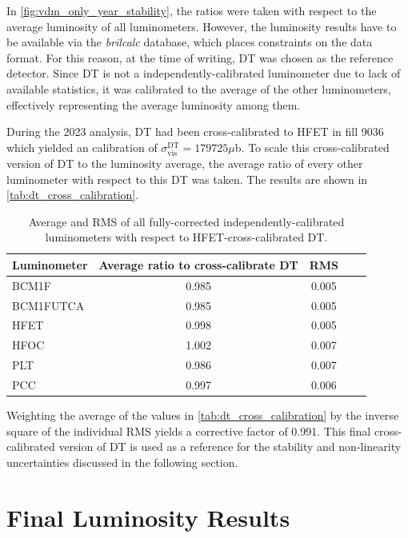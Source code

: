 In \autoref{fig:vdm_only_year_stability}, the ratios were taken with respect to the average luminosity of all luminometers. However, the luminosity results have to be available via the \textit{brilcalc} database, which places constraints on the data format. For this reason, at the time of writing, DT was chosen as the reference detector. Since DT is not a independently-calibrated luminometer due to lack of available statistics, it was calibrated to the average of the other luminometers, effectively representing the average luminosity among them.

During the 2023 analysis, DT had been cross-calibrated to HFET in fill 9036 which yielded an calibration of $\sigma^{\text{DT}}_{\mathrm{vis}} = 179725 \mu$b. To scale this cross-calibrated version of DT to the luminosity average, the average ratio of every other luminometer with respect to this DT was taken. The results are shown in \autoref{tab:dt_cross_calibration}.

\begin{table}[!htb]
	\caption{Average and RMS of all fully-corrected independently-calibrated luminometers with respect to HFET-cross-calibrated DT.}
	
	\label{tab:dt_cross_calibration}
	\centering
	\begin{tabular}{lcccc}
		\hline
		Luminometer & Average ratio to cross-calibrate DT & RMS \\
		\hline
		BCM1F     & 0.985 & 0.005 \\
		BCM1FUTCA & 0.985 & 0.005 \\
		HFET      & 0.998 & 0.005 \\
		HFOC      & 1.002 & 0.007 \\
		PLT       & 0.986 & 0.007 \\
		PCC       & 0.997 & 0.006 \\
		\hline
	\end{tabular}
\end{table}

Weighting the average of the values in \autoref{tab:dt_cross_calibration} by the inverse square of the individual RMS yields a corrective factor of 0.991. This final cross-calibrated version of DT is used as a reference for the stability and non-linearity uncertainties discussed in the following section.

\section{Final Luminosity Results}


